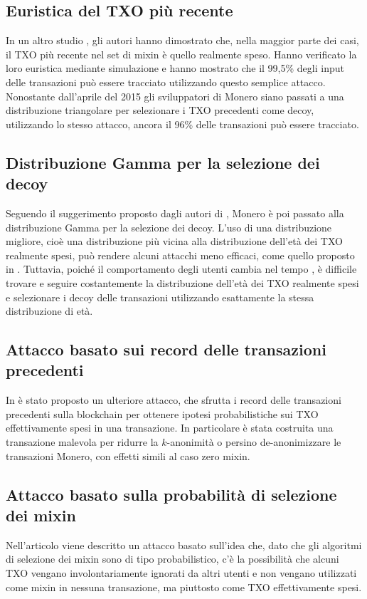 \subsection{Euristica del TXO più recente}
In un altro studio \cite{ref2}, gli autori hanno dimostrato che, nella maggior parte dei casi, il TXO più recente nel set di mixin è quello realmente speso. Hanno verificato la loro euristica mediante simulazione e hanno mostrato che il 99,5\% degli input delle transazioni può essere tracciato utilizzando questo semplice attacco. Nonostante dall'aprile del 2015 gli sviluppatori di Monero siano passati a una distribuzione triangolare per selezionare i TXO precedenti come decoy, utilizzando lo stesso attacco, ancora il 96\% delle transazioni può essere tracciato.

\subsection{Distribuzione Gamma per la selezione dei decoy}
Seguendo il suggerimento proposto dagli autori di \cite{ref4}, Monero è poi passato alla distribuzione Gamma per la selezione dei decoy. L'uso di una distribuzione migliore, cioè una distribuzione più vicina alla distribuzione dell'età dei TXO realmente spesi, può rendere alcuni attacchi meno efficaci, come quello proposto in \cite{ref2}. Tuttavia, poiché il comportamento degli utenti cambia nel tempo \cite{reference7}, è difficile trovare e seguire costantemente la distribuzione dell'età dei TXO realmente spesi e selezionare i decoy delle transazioni utilizzando esattamente la stessa distribuzione di età.

\subsection{Attacco basato sui record delle transazioni precedenti}
In \cite{ref5} è stato proposto un ulteriore attacco, che sfrutta i record delle transazioni precedenti sulla blockchain per ottenere ipotesi probabilistiche sui TXO effettivamente spesi in una transazione. In particolare è stata costruita una transazione malevola per ridurre la $k$-anonimità o persino de-anonimizzare le transazioni Monero, con effetti simili al caso zero mixin.

\subsection{Attacco basato sulla probabilità di selezione dei mixin}
Nell'articolo \cite{refnew} viene descritto un attacco basato sull'idea che, dato che gli algoritmi di selezione dei mixin sono di tipo probabilistico, c'è la possibilità che alcuni TXO vengano involontariamente ignorati da altri utenti e non vengano utilizzati come mixin in nessuna transazione, ma piuttosto come TXO effettivamente spesi.

